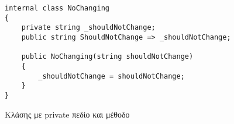 \begin{listing}[htbp]
\begin{verbatim}
internal class NoChanging
{
    private string _shouldNotChange;
    public string ShouldNotChange => _shouldNotChange;

    public NoChanging(string shouldNotChange)
    {
        _shouldNotChange = shouldNotChange;
    }
}
\end{verbatim}
\caption{Κλάσης με private πεδίο και μέθοδο}
\label{reflectionClass}
\end{listing}